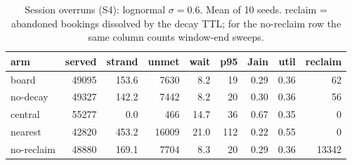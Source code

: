 \begin{table}
\centering
\caption{Session overruns (S4): lognormal $\sigma=0.6$.  Mean of 10 seeds.  reclaim = abandoned bookings
dissolved by the decay TTL; for the no-reclaim row the same column
counts window-end sweeps.}
\label{tab:e4lt}
\begin{tabular}{@{}lrrrrrrrr@{}}
\toprule
arm & served & strand & unmet & wait & p95 & Jain & util & reclaim \\
\midrule
board & 49095 & 153.6 & 7630 & 8.2 & 19 & 0.29 & 0.36 & 62 \\
no-decay & 49327 & 142.2 & 7442 & 8.2 & 20 & 0.30 & 0.36 & 56 \\
central & 55277 & 0.0 & 466 & 14.7 & 36 & 0.67 & 0.35 & 0 \\
nearest & 42820 & 453.2 & 16009 & 21.0 & 112 & 0.22 & 0.55 & 0 \\
no-reclaim & 48880 & 169.1 & 7704 & 8.3 & 20 & 0.29 & 0.36 & 13342 \\
\bottomrule
\end{tabular}
\end{table}
